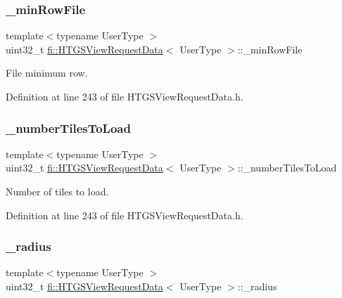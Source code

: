 \subsubsection{\texorpdfstring{\+\_\+min\+Row\+File}{\_minRowFile}}
{\footnotesize\ttfamily template$<$typename User\+Type $>$ \\
uint32\+\_\+t \hyperlink{classfi_1_1HTGSViewRequestData}{fi\+::\+H\+T\+G\+S\+View\+Request\+Data}$<$ User\+Type $>$\+::\+\_\+min\+Row\+File\hspace{0.3cm}{\ttfamily [private]}}



File minimum row. 



Definition at line 243 of file H\+T\+G\+S\+View\+Request\+Data.\+h.

\mbox{\label{classfi_1_1HTGSViewRequestData_aaefe54e23f62e0a3f0d3ac850d61bed7}} 
\subsubsection{\texorpdfstring{\+\_\+number\+Tiles\+To\+Load}{\_numberTilesToLoad}}
{\footnotesize\ttfamily template$<$typename User\+Type $>$ \\
uint32\+\_\+t \hyperlink{classfi_1_1HTGSViewRequestData}{fi\+::\+H\+T\+G\+S\+View\+Request\+Data}$<$ User\+Type $>$\+::\+\_\+number\+Tiles\+To\+Load\hspace{0.3cm}{\ttfamily [private]}}



Number of tiles to load. 



Definition at line 243 of file H\+T\+G\+S\+View\+Request\+Data.\+h.

\mbox{\label{classfi_1_1HTGSViewRequestData_abbd88a3c902e9b8d4a7dc75db51d43df}} 
\subsubsection{\texorpdfstring{\+\_\+radius}{\_radius}}
{\footnotesize\ttfamily template$<$typename User\+Type $>$ \\
uint32\+\_\+t \hyperlink{classfi_1_1HTGSViewRequestData}{fi\+::\+H\+T\+G\+S\+View\+Request\+Data}$<$ User\+Type $>$\+::\+\_\+radius\hspace{0.3cm}{\ttfamily [private]}}



